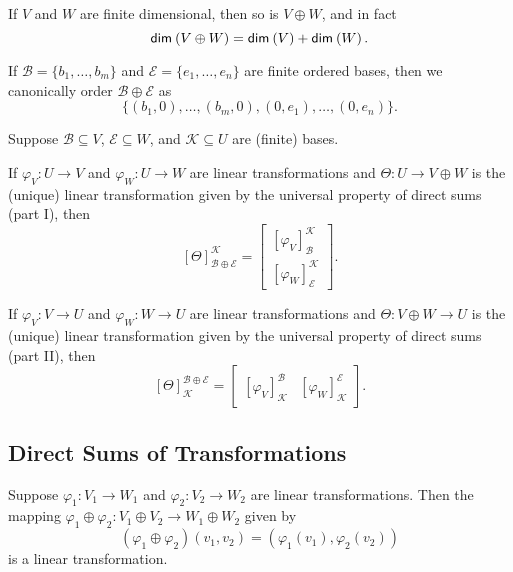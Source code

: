 \documentclass{memoir}
\begin{document}
\begin{cor}
If $V$ and $W$ are finite dimensional, then so is $V \oplus W$, and in fact \[ \operatorname{\mathsf{dim}}_{}\left(V \oplus W\right) = \operatorname{\mathsf{dim}}_{}\left(V\right) + \operatorname{\mathsf{dim}}_{}\left(W\right). \]
\end{cor}

If $\mathcal{B} = \{b_1,\ldots,b_m\}$ and $\mathcal{E} = \{e_1,\ldots,e_n\}$ are finite ordered bases, then we canonically order $\mathcal{B} \oplus \mathcal{E}$ as \[ \{ (b_1,0), \ldots, (b_m,0), (0,e_1), \ldots, (0,e_n) \}. \]

\begin{prp}
Suppose $\mathcal{B} \subseteq V$, $\mathcal{E} \subseteq W$, and $\mathcal{K} \subseteq U$ are (finite) bases.
\begin{enumerate*}
\item If $\varphi_V : U \rightarrow V$ and $\varphi_W : U \rightarrow W$ are linear transformations and $\Theta : U \rightarrow V \oplus W$ is the (unique) linear transformation given by the universal property of direct sums (part I), then \[ [\Theta]^\mathcal{K}_{\mathcal{B} \oplus \mathcal{E}} = \left[ \begin{array}{c} [\varphi_V]^\mathcal{K}_\mathcal{B} \\ \hline [\varphi_W]^\mathcal{K}_\mathcal{E} \end{array} \right]. \]
\item If $\varphi_V : V \rightarrow U$ and $\varphi_W : W \rightarrow U$ are linear transformations and $\Theta : V \oplus W \rightarrow U$ is the (unique) linear transformation given by the universal property of direct sums (part II), then \[ [\Theta]^{\mathcal{B} \oplus \mathcal{E}}_\mathcal{K} = \left[ \begin{array}{c|c} [\varphi_V]^\mathcal{B}_\mathcal{K} & [\varphi_W]^\mathcal{E}_\mathcal{K} \end{array} \right]. \]
\end{enumerate*}
\end{prp}

\subsection*{Direct Sums of Transformations}

\begin{dfn}
Suppose $\varphi_1 : V_1 \rightarrow W_1$ and $\varphi_2 : V_2 \rightarrow W_2$ are linear transformations. Then the mapping $\varphi_1 \oplus \varphi_2 : V_1 \oplus V_2 \rightarrow W_1 \oplus W_2$ given by \[ (\varphi_1 \oplus \varphi_2)(v_1,v_2) = (\varphi_1(v_1), \varphi_2(v_2)) \] is a linear transformation.
\end{dfn}
\end{document}
